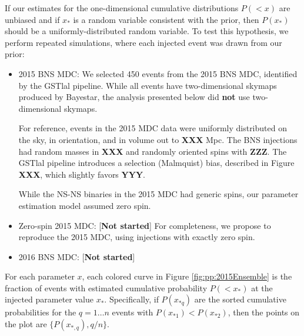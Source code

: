 \documentclass[twocolumn,prd,nofootinbib]{revtex4}
\newcommand\unit[1]{{\rm #1}}
\newcommand\nEventsMDC{450}
\newcommand\BS{{\sc Bayestar}}
\begin{document}
If our estimates for the one-dimensional cumulative distributions $P(<x)$ are unbiased and if $x_*$ is a random variable
consistent with the prior, then $P(x_*)$ should be a uniformly-distributed random variable.   To test this hypothesis,
we perform repeated simulations, where each injected event was drawn from our prior:
\begin{itemize}
\item 2015 BNS MDC:   We selected \nEventsMDC{} events from the 2015 BNS MDC, identified by the GSTlal pipeline.  While all events
  have two-dimensional skymaps produced by \BS{}, the analysis presented below did \textbf{not} use two-dimensional skymaps.

For reference, events in the 2015 MDC data were uniformly distributed on the sky, in orientation, and in volume out to
\textbf{XXX} \unit{Mpc}.  The BNS injections had random masses in \textbf{XXX} and randomly oriented spins with
\textbf{ZZZ}.   The GSTlal pipeline introduces a selection (Malmquist) bias, described in Figure \textbf{XXX},
which slightly favors \textbf{YYY}.

While the NS-NS binaries in the 2015 MDC had generic spins, our parameter estimation model assumed zero spin.

\item Zero-spin 2015 MDC: [\textbf{Not started}]  For completeness, we propose to reproduce the 2015 MDC,  using
  injections with exactly zero spin.

\item 2016 BNS MDC: [\textbf{Not started}]

\end{itemize}

For each parameter $x$, each colored curve in Figure  \ref{fig:pp:2015Ensemble} is  the fraction of events with
estimated cumulative probability $P(<x_*)$ at the injected parameter value $x_*$.  
Specifically, if $P(x_{*q})$ are the sorted cumulative probabilities for the $q=1\ldots n$ events with
$P(x_{*1})<P(x_{*2})$, then the points on the plot are $\{P(x_{*,q}),q/n\}$.  
%
\end{document}
